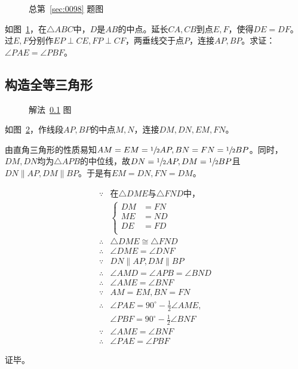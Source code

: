 

\begin{figure}[htbp]
  \centering
  \caption{总第~\ref{sec:0098} 题图} \label{fig:0098}
\end{figure}

如图~\ref{fig:0098}，在$\triangle ABC$中，$D$是$AB$的中点。延长$CA, CB$到点$E, F$，使得$DE = DF$。过$E, F$分别作$EP \perp CE, FP \perp CF$，两垂线交于点$P$，连接$AP, BP$。求证：$\angle PAE = \angle PBF$。

\subsection{构造全等三角形} \label{subsec:0098-eqtri}

\begin{figure}[htbp]
  \centering
  \caption{解法~\ref{subsec:0098-eqtri} 图} \label{fig:0098-eqtri}
\end{figure}

如图~\ref{fig:0098-eqtri}，作线段$AP, BP$的中点$M, N$，连接$DM, DN, EM, FN$。

由直角三角形的性质易知$AM = EM = \sfrac12AP, BN = FN = \sfrac12BP$。同时，$DM, DN$均为$\triangle APB$的中位线，故$DN = \sfrac12AP, DM = \sfrac12BP$且$DN \parallel AP, DM \parallel BP$。于是有$EM = DN, FN = DM$。

\begin{align*}
  \because{}& \text{在$\triangle DME$与$\triangle FND$中，} \\
  & \left\{ \begin{aligned}
    DM &= FN \\
    ME &= ND \\
    DE &= FD \\
  \end{aligned} \right. \\
  \therefore{}& \triangle DME \cong \triangle FND \\
  \therefore{}& \angle DME = \angle DNF \\
  \because  {}& DN \parallel AP, DM \parallel BP \\
  \therefore{}& \angle AMD = \angle APB = \angle BND \\
  \therefore{}& \angle AME = \angle BNF \\
  \because  {}& AM = EM, BN = FN \\
  \therefore{}& \angle PAE = 90^\circ - \frac12\angle AME, \\
  & \angle PBF = 90^\circ - \frac12\angle BNF \\
  \because  {}& \angle AME = \angle BNF \\
  \therefore{}& \angle PAE = \angle PBF
\end{align*}

证毕。
